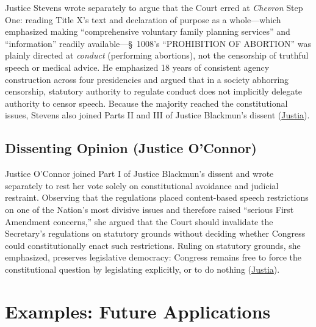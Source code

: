 \documentclass[12pt]{article}
\begin{document}
Justice Stevens wrote separately to argue that the Court erred at \textit{Chevron} Step One: reading Title X's text and declaration of purpose as a whole---which emphasized making ``comprehensive voluntary family planning services'' and ``information'' readily available---\S~1008's ``PROHIBITION OF ABORTION'' was plainly directed at \textit{conduct} (performing abortions), not the censorship of truthful speech or medical advice. He emphasized 18 years of consistent agency construction across four presidencies and argued that in a society abhorring censorship, statutory authority to regulate conduct does not implicitly delegate authority to censor speech. Because the majority reached the constitutional issues, Stevens also joined Parts II and III of Justice Blackmun's dissent (\href{https://supreme.justia.com/cases/federal/us/500/173/}{Justia}).

\subsection{Dissenting Opinion (Justice O'Connor)}

Justice O'Connor joined Part I of Justice Blackmun's dissent and wrote separately to rest her vote solely on constitutional avoidance and judicial restraint. Observing that the regulations placed content-based speech restrictions on one of the Nation's most divisive issues and therefore raised ``serious First Amendment concerns,'' she argued that the Court should invalidate the Secretary's regulations on statutory grounds without deciding whether Congress could constitutionally enact such restrictions. Ruling on statutory grounds, she emphasized, preserves legislative democracy: Congress remains free to force the constitutional question by legislating explicitly, or to do nothing (\href{https://supreme.justia.com/cases/federal/us/500/173/}{Justia}).

\section{Examples: Future Applications}
\end{document}
